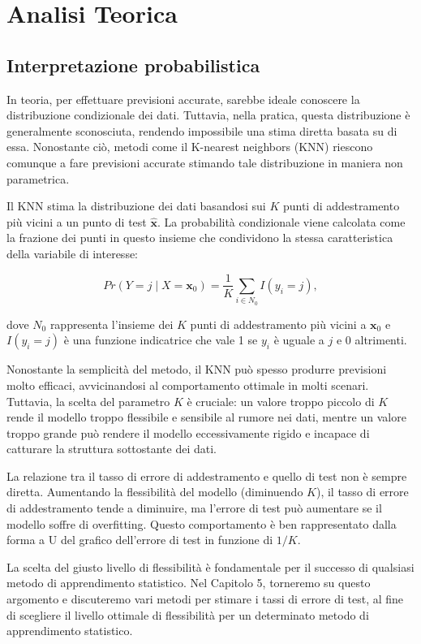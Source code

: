 \section{Analisi Teorica}

\subsection{Interpretazione probabilistica}

In teoria, per effettuare previsioni accurate, sarebbe ideale conoscere la distribuzione 
condizionale dei dati. Tuttavia, nella pratica, questa distribuzione è generalmente sconosciuta, 
rendendo impossibile una stima diretta basata su di essa. Nonostante ciò, metodi come il K-nearest 
neighbors (KNN) riescono comunque a fare previsioni accurate stimando tale distribuzione in maniera non parametrica.

Il KNN stima la distribuzione dei dati basandosi sui \( K \) punti di addestramento più vicini a un punto 
di test \( \hat{\mathbf{x}} \). La probabilità condizionale viene calcolata come la frazione dei punti 
in questo insieme che condividono la stessa caratteristica della variabile di interesse:

\[
Pr(Y = j \mid X = \mathbf{x}_0) = \frac{1}{K} \sum_{i \in N_0} I(y_i = j),
\]

dove \( N_0 \) rappresenta l'insieme dei \( K \) punti di addestramento più vicini a \( \mathbf{x}_0 \) e \( I(y_i = j) \) è una funzione indicatrice che vale 1 se \( y_i \) è uguale a \( j \) e 0 altrimenti.

Nonostante la semplicità del metodo, il KNN può spesso produrre previsioni molto efficaci, avvicinandosi al comportamento ottimale in molti scenari. Tuttavia, la scelta del parametro \( K \) è cruciale: un valore troppo piccolo di \( K \) rende il modello troppo flessibile e sensibile al rumore nei dati, mentre un valore troppo grande può rendere il modello eccessivamente rigido e incapace di catturare la struttura sottostante dei dati.

La relazione tra il tasso di errore di addestramento e quello di test non è sempre diretta. Aumentando la flessibilità del modello (diminuendo \( K \)), il tasso di errore di addestramento tende a diminuire, ma l'errore di test può aumentare se il modello soffre di overfitting. Questo comportamento è ben rappresentato dalla forma a U del grafico dell'errore di test in funzione di \( 1/K \).

La scelta del giusto livello di flessibilità è fondamentale per il successo di qualsiasi metodo di apprendimento statistico. Nel Capitolo 5, torneremo su questo argomento e discuteremo vari metodi per stimare i tassi di errore di test, al fine di scegliere il livello ottimale di flessibilità per un determinato metodo di apprendimento statistico.

